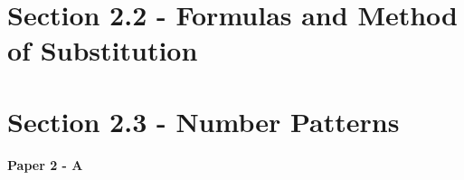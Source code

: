 \documentclass[12pt, a4paper]{article}
\begin{document}
\section*{Section 2.2 - Formulas and Method of Substitution}\label{section:1-2-2}





\section*{Section 2.3 - Number Patterns}\label{section:1-2-3}

\textbf{Paper 2 - A}
\begin{enumx}[label=\arabic*.,start=1]
\item {}\label{DSE2012S-CoreP2-Q11} 
\item {}\label{DSE2012-CoreP2-Q12} 
\item {}\label{DSE2014-CoreP2-Q14} 
\item {}\label{DSE2015-CoreP2-Q13} 
\item {}\label{DSE2016-CoreP2-Q14} 
\item {}\label{DSE2017-CoreP2-Q13} 
\item {}\label{DSE2018-CoreP2-Q12} 
\item {}\label{DSE2019-CoreP2-Q14} 
\item {}\label{DSE2020-CoreP2-Q12} 
\item {}\label{DSE2021-CoreP2-Q13} 
\item {}\label{DSE2022-CoreP2-Q14} 
\item {}\label{DSE2023-CoreP2-Q14} 
\end{enumx}
\end{document}
